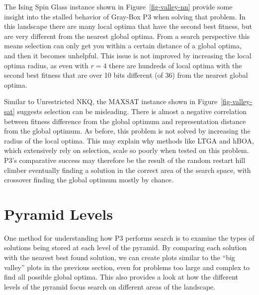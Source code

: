 The Ising Spin Glass instance shown in Figure~\ref{fig-valley-nn} provide some insight into the stalled behavior of Gray-Box
P3 when solving that problem. In this landscape there are many local optima that have the second best fitness, but are very
different from the nearest global optima. From a search perspective this means selection can only get you within a certain distance
of a global optima, and then it becomes unhelpful. This issue is not improved by increasing the local optima radius, as even with
$r=4$ there are hundreds of local optima with the second best fitness that are over 10 bits different (of 36) from
the nearest global optima.

\begin{figure*}
  \centering
  \caption{Location and quality of local optima in comparison to the global optima for a representative MAX-SAT problem
           with $N=36$.}
  \label{fig-valley-sat}
\end{figure*}

Similar to Unrestricted NKQ, the MAXSAT instance shown in Figure~\ref{fig-valley-sat} suggests selection can be misleading.
There is almost a negative correlation between fitness difference from the global optimum and representation distance from the
global optimum. As before, this problem is not solved by increasing the radius of the local optima.
This may explain why methods like LTGA and hBOA, which extensively rely on selection,
scale so poorly when tested on this problem. P3's comparative success may therefore be the result of the random restart hill climber
eventually finding a solution in the correct area of the search space, with crossover finding the global optimum mostly by chance.

\section{Pyramid Levels}
One method for understanding how P3 performs search is to examine the types of solutions being stored at each level
of the pyramid. By comparing each solution with the nearest best found solution, we can create plots similar to the ``big valley''
plots 
in the previous section, even for problems too large and complex to find all possible global optima. 
This also provides a look at how the different levels of the pyramid focus search on different areas of the landscape.

\begin{figure*}
  \centering
  \caption{Distribution of local optima stored at each level of Gray-Box P3 in relation to the global optimum on
           the Deceptive Step Trap problem $N=6000$ and traps of size 5.}
  \label{fig-level-dst}
\end{figure*}

